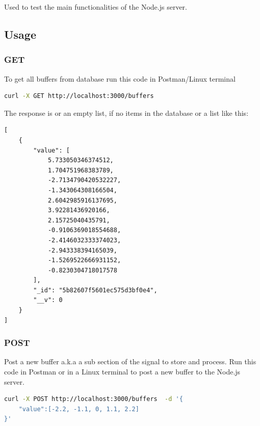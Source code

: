 \documentclass[12pt, a4paper, portrait]{article}
\begin{document}
Used to test the main functionalities of the Node.js server.

\subsection{Usage}
\subsubsection{GET}
To get all buffers from database run this code in Postman/Linux terminal
\begin{lstlisting}[language=bash, caption=Get all buffers]
curl -X GET http://localhost:3000/buffers
\end{lstlisting}

The response is or an empty list, if no items in the database or a list like this:
\begin{lstlisting}[language=XML, caption=A sub section of the signal to process]
[
    {
        "value": [
            5.733050346374512,
            1.704751968383789,
            -2.7134790420532227,
            -1.343064308166504,
            2.6042985916137695,
            3.92281436920166,
            2.15725040435791,
            -0.9106369018554688,
            -2.4146032333374023,
            -2.943338394165039,
            -1.5269522666931152,
            -0.8230304718017578
        ],
        "_id": "5b82607f5601ec575d3bf0e4",
        "__v": 0
    }
]
\end{lstlisting}

\subsubsection{POST}
Post a new buffer a.k.a a sub section of the signal to store and process. Run this code in Postman or in a Linux terminal to post a new buffer to the Node.js server.
\begin{lstlisting}[language=bash, caption=Send signal data via REST]
curl -X POST http://localhost:3000/buffers  -d '{
	"value":[-2.2, -1.1, 0, 1.1, 2.2]
}'
\end{lstlisting}
\end{document}

